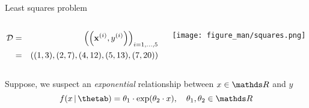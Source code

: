 \documentclass[11pt,compress,t,notes=noshow, xcolor=table]{beamer}
\begin{document}
\begin{vbframe}{Least squares problem}
\begin{columns}
\begin{column}{0.55\textwidth}
\begin{footnotesize}
\begin{eqnarray*}
\mathcal{D} &=& \left(\left(\mathbf{x}^{(i)}, y^{(i)}\right)\right)_{i = 1, ..., 5} \\ &=& \left((1,3),(2,7),(4,12),(5,13),(7,20)\right)
\end{eqnarray*}
\end{footnotesize}
\end{column}
\begin{column}{0.4\textwidth}
	\vspace*{-0.5cm}  
    \begin{center}
     \texttt{[image: figure\_man/squares.png]}
     \end{center}
\end{column}
\end{columns}







\framebreak

Suppose, we suspect an \textit{exponential} relationship between $x \in \R$ and $y$ 
\begin{equation*}
    f(x \,|\, \thetab) = \theta_1 \cdot \exp(\theta_2 \cdot x), \quad \theta_1, \theta_2 \in \R
\end{equation*}




\end{vbframe}
\end{document}
